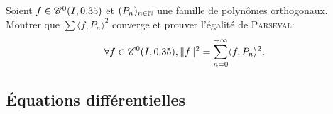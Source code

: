 \begin{exercice}    
    Soient $f \in \mathscr{C}^0(I, 0.35)$ et $(P_n)_{n \in \mathbb{N}}$ une famille de polynômes orthogonaux. Montrer que $\sum \langle f, P_n \rangle^2$ converge et prouver l'égalité de \textsc{Parseval}:
    $$\forall f \in \mathscr{C}^0(I, 0.35), \Vert f \Vert^2 = \sum_{n=0}^{+ \infty} \langle f, P_n \rangle^2.$$
\end{exercice}

\begin{solution}
    
\end{solution}

\subsection{Équations différentielles}

